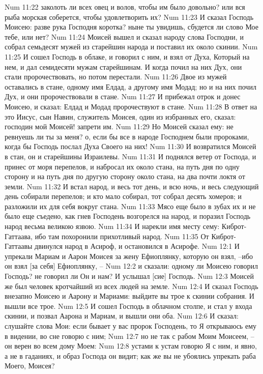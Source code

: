 Num 11:22  заколоть ли всех овец и волов, чтобы им было довольно? или вся рыба морская соберется, чтобы удовлетворить их?
Num 11:23  И сказал Господь Моисею: разве рука Господня коротка? ныне ты увидишь, сбудется ли слово Мое тебе, или нет?
Num 11:24  Моисей вышел и сказал народу слова Господни, и собрал семьдесят мужей из старейшин народа и поставил их около скинии.
Num 11:25  И сошел Господь в облаке, и говорил с ним, и взял от Духа, Который на нем, и дал семидесяти мужам старейшинам. И когда почил на них Дух, они стали пророчествовать, но потом перестали.
Num 11:26  Двое из мужей оставались в стане, одному имя Елдад, а другому имя Модад; но и на них почил Дух, и они пророчествовали в стане.
Num 11:27  И прибежал отрок и донес Моисею, и сказал: Елдад и Модад пророчествуют в стане.
Num 11:28  В ответ на это Иисус, сын Навин, служитель Моисея, один из избранных его, сказал: господин мой Моисей! запрети им.
Num 11:29  Но Моисей сказал ему: не ревнуешь ли ты за меня? о, если бы все в народе Господнем были пророками, когда бы Господь послал Духа Своего на них!
Num 11:30  И возвратился Моисей в стан, он и старейшины Израилевы.
Num 11:31  И поднялся ветер от Господа, и принес от моря перепелов, и набросал их около стана, на путь дня по одну сторону и на путь дня по другую сторону около стана, на два почти локтя от земли.
Num 11:32  И встал народ, и весь тот день, и всю ночь, и весь следующий день собирали перепелов; и кто мало собирал, тот собрал десять хомеров; и разложили их для себя вокруг стана.
Num 11:33  Мясо еще было в зубах их и не было еще съедено, как гнев Господень возгорелся на народ, и поразил Господь народ весьма великою язвою.
Num 11:34  И нарекли имя месту сему: Киброт-Гаттаава, ибо там похоронили прихотливый народ.
Num 11:35  От Киброт-Гаттаавы двинулся народ в Асироф, и остановился в Асирофе.
Num 12:1  И упрекали Мариам и Аарон Моисея за жену Ефиоплянку, которую он взял, --ибо он взял [за себя] Ефиоплянку, --
Num 12:2  и сказали: одному ли Моисею говорил Господь? не говорил ли Он и нам? И услышал [сие] Господь.
Num 12:3  Моисей же был человек кротчайший из всех людей на земле.
Num 12:4  И сказал Господь внезапно Моисею и Аарону и Мариами: выйдите вы трое к скинии собрания. И вышли все трое.
Num 12:5  И сошел Господь в облачном столпе, и стал у входа скинии, и позвал Аарона и Мариам, и вышли они оба.
Num 12:6  И сказал: слушайте слова Мои: если бывает у вас пророк Господень, то Я открываюсь ему в видении, во сне говорю с ним;
Num 12:7  но не так с рабом Моим Моисеем, --он верен во всем дому Моем:
Num 12:8  устами к устам говорю Я с ним, и явно, а не в гаданиях, и образ Господа он видит; как же вы не убоялись упрекать раба Моего, Моисея?
